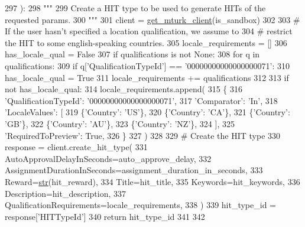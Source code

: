\begin{DoxyCode}
297 ):
298     \textcolor{stringliteral}{"""}
299 \textcolor{stringliteral}{    Create a HIT type to be used to generate HITs of the requested params.}
300 \textcolor{stringliteral}{    """}
301     client = \hyperlink{namespaceparlai_1_1mturk_1_1core_1_1mturk__utils_a577e2527c04682284394b0951a090695}{get\_mturk\_client}(is\_sandbox)
302 
303     \textcolor{comment}{# If the user hasn't specified a location qualification, we assume to}
304     \textcolor{comment}{# restrict the HIT to some english-speaking countries.}
305     locale\_requirements = []
306     has\_locale\_qual = \textcolor{keyword}{False}
307     \textcolor{keywordflow}{if} qualifications \textcolor{keywordflow}{is} \textcolor{keywordflow}{not} \textcolor{keywordtype}{None}:
308         \textcolor{keywordflow}{for} q \textcolor{keywordflow}{in} qualifications:
309             \textcolor{keywordflow}{if} q[\textcolor{stringliteral}{'QualificationTypeId'}] == \textcolor{stringliteral}{'00000000000000000071'}:
310                 has\_locale\_qual = \textcolor{keyword}{True}
311         locale\_requirements += qualifications
312 
313     \textcolor{keywordflow}{if} \textcolor{keywordflow}{not} has\_locale\_qual:
314         locale\_requirements.append(
315             \{
316                 \textcolor{stringliteral}{'QualificationTypeId'}: \textcolor{stringliteral}{'00000000000000000071'},
317                 \textcolor{stringliteral}{'Comparator'}: \textcolor{stringliteral}{'In'},
318                 \textcolor{stringliteral}{'LocaleValues'}: [
319                     \{\textcolor{stringliteral}{'Country'}: \textcolor{stringliteral}{'US'}\},
320                     \{\textcolor{stringliteral}{'Country'}: \textcolor{stringliteral}{'CA'}\},
321                     \{\textcolor{stringliteral}{'Country'}: \textcolor{stringliteral}{'GB'}\},
322                     \{\textcolor{stringliteral}{'Country'}: \textcolor{stringliteral}{'AU'}\},
323                     \{\textcolor{stringliteral}{'Country'}: \textcolor{stringliteral}{'NZ'}\},
324                 ],
325                 \textcolor{stringliteral}{'RequiredToPreview'}: \textcolor{keyword}{True},
326             \}
327         )
328 
329     \textcolor{comment}{# Create the HIT type}
330     response = client.create\_hit\_type(
331         AutoApprovalDelayInSeconds=auto\_approve\_delay,
332         AssignmentDurationInSeconds=assignment\_duration\_in\_seconds,
333         Reward=\hyperlink{namespacegenerate__task__READMEs_a5b88452ffb87b78c8c85ececebafc09f}{str}(hit\_reward),
334         Title=hit\_title,
335         Keywords=hit\_keywords,
336         Description=hit\_description,
337         QualificationRequirements=locale\_requirements,
338     )
339     hit\_type\_id = response[\textcolor{stringliteral}{'HITTypeId'}]
340     \textcolor{keywordflow}{return} hit\_type\_id
341 
342 
\end{DoxyCode}
